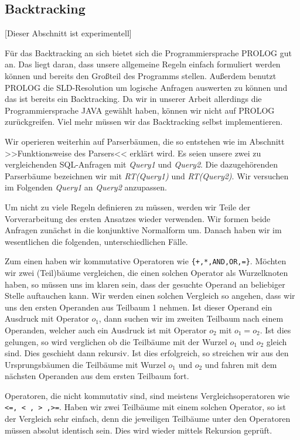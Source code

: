 \subsection{Backtracking}

[Dieser Abschnitt ist experimentell]

Für das Backtracking an sich bietet sich die Programmiersprache PROLOG gut an. Das liegt daran, dass unsere allgemeine Regeln einfach formuliert werden können und bereits den Großteil des Programms stellen. Außerdem benutzt PROLOG die SLD-Resolution um logische Anfragen auswerten zu können und das ist bereits ein Backtracking. Da wir in unserer Arbeit allerdings die Programmiersprache JAVA gewählt haben, können wir nicht auf PROLOG zurückgreifen. Viel mehr müssen wir das Backtracking selbst implementieren. 

Wir operieren weiterhin auf Parserbäumen, die so entstehen wie im Abschnitt >>Funktionsweise des Parsers<< erklärt wird. Es seien unsere zwei zu vergleichenden SQL-Anfragen mit \textit{Query1} und \textit{Query2}. Die dazugehörenden Parserbäume bezeichnen wir mit \textit{RT(Query1)} und \textit{RT(Query2)}. Wir versuchen im Folgenden \textit{Query1} an \textit{Query2} anzupassen.

Um nicht zu viele Regeln definieren zu müssen, werden wir Teile der Vorverarbeitung des ersten Ansatzes wieder verwenden. Wir formen beide Anfragen zunächst in die konjunktive Normalform um. Danach haben wir im wesentlichen die folgenden, unterschiedlichen Fälle.

Zum einen haben wir kommutative Operatoren wie \verb|{+,*,AND,OR,=}|. Möchten wir zwei (Teil)bäume vergleichen, die einen solchen Operator als Wurzelknoten haben, so müssen uns im klaren sein, dass der gesuchte Operand an beliebiger Stelle auftauchen kann. Wir werden einen solchen Vergleich so angehen, dass wir uns den ersten Operanden aus Teilbaum 1 nehmen. Ist dieser Operand ein Ausdruck mit Operator $o_1$, dann suchen wir im zweiten Teilbaum nach einem Operanden, welcher auch ein Ausdruck ist mit Operator $o_2$ mit $o_1=o_2$. Ist dies gelungen, so wird verglichen ob die Teilbäume mit der Wurzel $o_1$ und $o_2$ gleich sind. Dies geschieht dann rekursiv. Ist dies erfolgreich, so streichen wir aus den Ursprungsbäumen die Teilbäume mit Wurzel $o_1$ und $o_2$ und fahren mit dem nächsten Operanden aus dem ersten Teilbaum fort.

Operatoren, die nicht kommutativ sind, sind meistens Vergleichsoperatoren wie \verb|<=, < , > ,>=|. Haben wir zwei Teilbäume mit einem solchen Operator, so ist der Vergleich sehr einfach, denn die jeweiligen Teilbäume unter den Operatoren müssen absolut identisch sein. Dies wird wieder mittels Rekursion geprüft.

